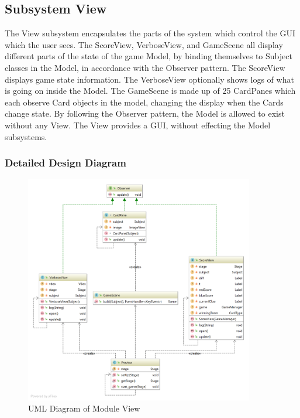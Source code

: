 \subsection{Subsystem View}
The View subsystem encapsulates the parts of the system which control the GUI which the user sees. The ScoreView, VerboseView, and GameScene all display different parts of the state of the game Model, by binding themselves to Subject classes in the Model, in accordance with the Observer pattern. The ScoreView displays game state information. The VerboseView optionally shows logs of what is going on inside the Model. The GameScene is made up of 25 CardPanes which each observe Card objects in the model, changing the display when the Cards change state. By following the Observer pattern, the Model is allowed to exist without any View. The View provides a GUI, without effecting the Model subsystems.

\subsubsection{Detailed Design Diagram}

\begin{figure}[H]
\centering
\includegraphics[width=10cm]{Source/Module/View/View.png}
\caption{UML Diagram of Module View}
\label{View}
\end{figure}







